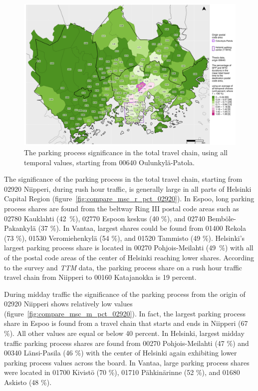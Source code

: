 \begin{figure}[H]%
    \centering
    \includegraphics[trim={0.9cm 0.3cm 0.25cm 0.3cm},clip,width=\textwidth]{images/compare_traveltimes_mapfill-msc_all_pct_fromzip-00640_28-09-2020.png}
    \caption[Parking process significance from Oulunkylä-Patola, all temporal values]{The parking process significance in the total travel chain, using all temporal values, starting from 00640 Oulunkylä-Patola.}%
    \label{fig:compare_msc_all_pct_00640}%
\end{figure}

The significance of the parking process in the total travel chain, starting from 02920 Niipperi, during rush hour traffic, is generally large in all parts of Helsinki Capital Region (figure~\ref{fig:compare_msc_r_pct_02920}). In Espoo, long parking process shares are found from the beltway Ring III postal code areas such as 02780 Kauklahti (42~\%), 02770 Espoon keskus (40 \%), and 02740 Bemböle-Pakankylä (37 \%). In Vantaa, largest shares could be found from 01400 Rekola (73 \%), 01530 Veromiehenkylä (54 \%), and 01520 Tammisto (49 \%). Helsinki's largest parking process share is located in 00270 Pohjois-Meilahti (49~\%) with all of the postal code areas of the center of Helsinki reaching lower shares. According to the survey and \textit{TTM} data, the parking process share on a rush hour traffic travel chain from Niipperi to 00160 Katajanokka is 19 percent.

During midday traffic the significance of the parking process from the origin of 02920 Niipperi shows relatively low values (figure~\ref{fig:compare_msc_m_pct_02920}). In fact, the largest parking process share in Espoo is found from a travel chain that starts and ends in Niipperi (67 \%). All other values are equal or below 40 percent. In Helsinki, largest midday traffic parking process shares are found from 00270 Pohjois-Meilahti (47 \%) and 00340 Länsi-Pasila (46 \%) with the center of Helsinki again exhibiting lower parking process values across the board. In Vantaa, large parking process shares were located in 01700 Kivistö (70 \%), 01710 Pähkinärinne (52 \%), and 01680 Askisto (48 \%).

